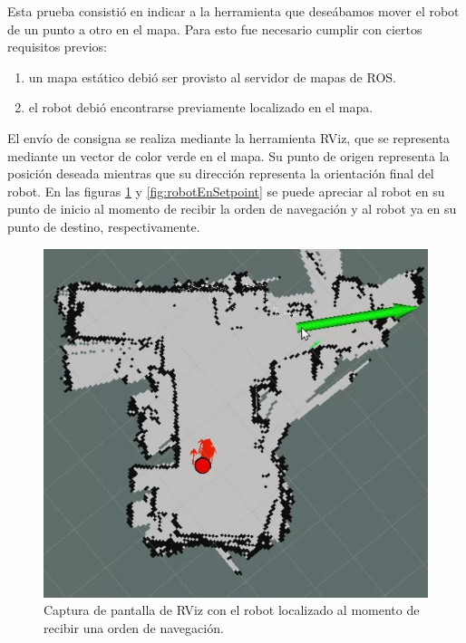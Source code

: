 Esta prueba consistió en indicar a la herramienta que deseábamos mover el robot de un punto a otro en el mapa. Para esto fue necesario cumplir con ciertos requisitos previos:

\begin{enumerate}
    \item un mapa estático debió ser provisto al servidor de mapas de ROS.
    \item el robot debió encontrarse previamente localizado en el mapa.
\end{enumerate}

El envío de consigna se realiza mediante la herramienta RViz, que se representa mediante un vector de color verde en el mapa. Su punto de origen representa la posición deseada mientras que su dirección representa la orientación final del robot. En las figuras \ref{fig:comandoNavegación} y \ref{fig:robotEnSetpoint} se puede apreciar al robot en su punto de inicio al momento de recibir la orden de navegación y al robot ya en su punto de destino, respectivamente.


\begin{figure}[ht]
    \centering
    \includegraphics[scale=0.35]{./Figures/comando_navegacion.png}
    \caption{Captura de pantalla de RViz con el robot localizado al momento de recibir una orden de navegación.}
    \label{fig:comandoNavegación}
\end{figure}


